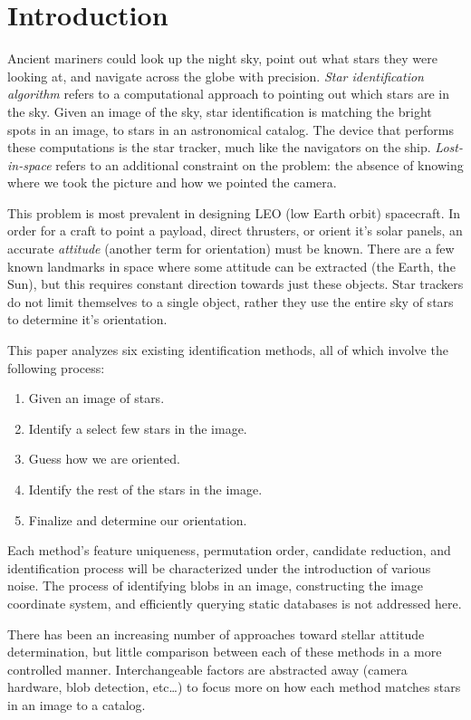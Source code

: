 \section{Introduction}\label{sec:introduction}
Ancient mariners could look up the night sky, point out what stars they were looking at, and navigate across the globe
with precision.
\textit{Star identification algorithm} refers to a computational approach to pointing out which stars
are in the sky.
Given an image of the sky, star identification is matching the bright spots in an image, to stars in an astronomical
catalog.
The device that performs these computations is the star tracker, much like the navigators on the ship.
\textit{Lost-in-space} refers to an additional constraint on the problem: the absence of knowing where we took
the picture and how we pointed the camera.

This problem is most prevalent in designing LEO (low Earth orbit) spacecraft.
In order for a craft to point a payload, direct thrusters, or orient it's solar panels, an accurate
\textit{attitude} (another term for orientation) must be known.
There are a few known landmarks in space where some attitude can be extracted (the Earth, the Sun), but this
requires constant direction towards just these objects.
Star trackers do not limit themselves to a single object, rather they use the entire sky of stars to determine it's
orientation.

This paper analyzes six existing identification methods, all of which involve the following process:
\begin{enumerate}
    \item Given an image of stars.
    \item Identify a select few stars in the image.
    \item Guess how we are oriented.
    \item Identify the rest of the stars in the image.
    \item Finalize and determine our orientation.
\end{enumerate}

Each method's feature uniqueness, permutation order, candidate reduction, and identification process will be
characterized under the introduction of various noise.
The process of identifying blobs in an image, constructing the image coordinate system, and efficiently querying
static databases is not addressed here.

There has been an increasing number of approaches toward stellar attitude determination, but little comparison between
each of these methods in a more controlled manner.
Interchangeable factors are abstracted away (camera hardware, blob detection, etc\ldots) to focus more on how each
method matches stars in an image to a catalog.